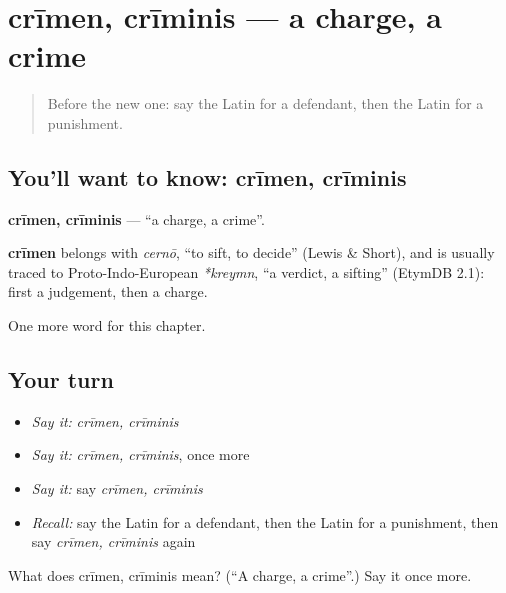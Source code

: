 \section[crīmen, crīminis]{crīmen, crīminis — a charge, a crime}

\label{lesson:LA-C218-crimen}



\begin{quote}
Before the new one: say the Latin for a defendant, then the Latin for a punishment.
\end{quote}

\subsection*{You'll want to know: crīmen, crīminis}
\textbf{crīmen, crīminis} — \textquotedblleft{}a charge, a crime\textquotedblright{}.

\begin{cousinweb}
\textbf{crīmen} belongs with \emph{cernō}, \textquotedblleft{}to sift, to decide\textquotedblright{} (Lewis \& Short), and is usually traced to Proto-Indo-European \emph{*kreymn}, \textquotedblleft{}a verdict, a sifting\textquotedblright{} (EtymDB 2.1): first a judgement, then a charge.
\end{cousinweb}

\begin{grammarlens}[title={What you've built}]
One more word for this chapter.
\end{grammarlens}

\subsection*{Your turn}
\begin{itemize}
\raggedright
  \item \emph{Say it:} \emph{crīmen, crīminis}
  \item \emph{Say it:} \emph{crīmen, crīminis}, once more
  \item \emph{Say it:} say \emph{crīmen, crīminis}
  \item \emph{Recall:} say the Latin for a defendant, then the Latin for a punishment, then say \emph{crīmen, crīminis} again
\end{itemize}

\begin{tcolorbox}[breakable,colback=teal!4,colframe=teal!35!black,title={Before you move on}]
What does crīmen, crīminis mean? (\textquotedblleft{}A charge, a crime\textquotedblright{}.) Say it once more.
\end{tcolorbox}
